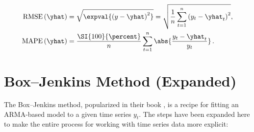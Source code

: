 \begin{subequations}\label{eq:time_series:RMSE_MAPE}
\begin{align}
\text{RMSE}\left(\yhat\right) &= \sqrt{\expval{\left(y - \yhat\right)^{2}}} = \sqrt{\frac{1}{n}\sum_{t=1}^{n} \left(y_{t} - \yhat_{t}\right)^{2}}, \label{eq:time_series:RMSE} \\
\text{MAPE}\left(\yhat\right) &= \frac{\SI{100}{\percent}}{n} \sum_{t=1}^{n} \abs{\frac{y_{t} - \yhat_{t}}{y_{t}}}\,. \label{eq:time_series:MAPE}
\end{align}
\end{subequations}

\section{Box--Jenkins Method (Expanded)}
\label{time_series:box_jenkins}

The Box--Jenkins method, popularized in their book \cite{boxjen76},
is a recipe for fitting an ARMA-based model to a given time series $y_{t}$.
The steps have been expanded here to make the entire process
for working with time series data more explicit:

